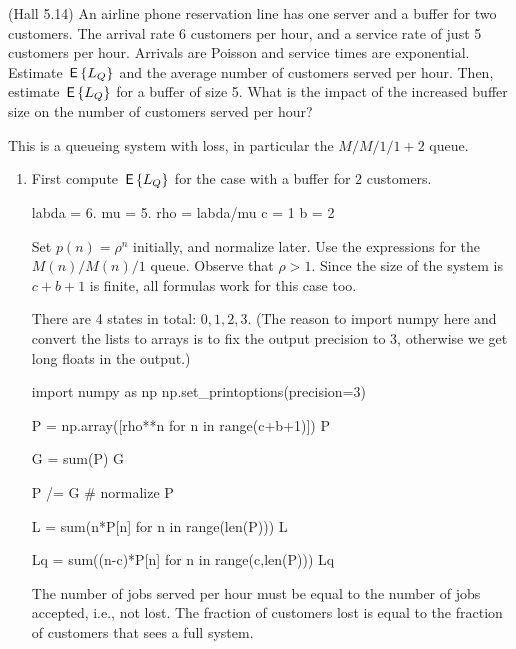 \begin{exercise}
  (Hall 5.14) An airline phone reservation line has one server and a
  buffer for two customers. The arrival rate 6 customers per hour, and
  a service rate of just 5 customers per hour. Arrivals are Poisson and service times are exponential. 
 Estimate $\,\mathsf{E}\left\{L_Q\right\}$ and the average number of customers served per hour. Then, estimate $\,\mathsf{E}\left\{L_Q\right\}$ for a buffer of size 5. What is the impact of the increased buffer size on the number of customers served per hour?
  \begin{hint}
This is a queueing system with loss, in particular the $M/M/1/1+2$ queue.
  \end{hint}
    \begin{solution}
      \begin{enumerate}
      \item 
First compute $\,\mathsf{E}\left\{L_Q\right\}$ for the case with a buffer for $2$ customers.

\begin{pyconsole}
labda = 6.
mu = 5.
rho = labda/mu
c = 1
b = 2
\end{pyconsole} 

Set $p(n) = \rho^n$ initially, and normalize later. Use the
expressions for the $M(n)/M(n)/1$ queue.  Observe that $\rho>1$. Since
the size of the system is $c+b+1$ is finite, all formulas work for
this case too.


There are 4 states in total: $0,1,2,3$. (The reason to import numpy here and convert the lists to arrays is to fix the output precision to 3, otherwise we get long floats in the output.)

\begin{pyconsole}
import numpy as np
np.set_printoptions(precision=3)

P = np.array([rho**n for n in range(c+b+1)])
P

G = sum(P)
G

P /= G # normalize
P
\end{pyconsole} 

\begin{pyconsole}
L = sum(n*P[n] for n in range(len(P)))
L

Lq = sum((n-c)*P[n] for n in range(c,len(P)))
Lq
\end{pyconsole} 


The number of jobs served per hour must be equal to the number of jobs
accepted, i.e., not lost. The fraction of customers lost is equal to
the fraction of customers that sees a full system.


\end{enumerate}
\end{solution}
\end{exercise}
